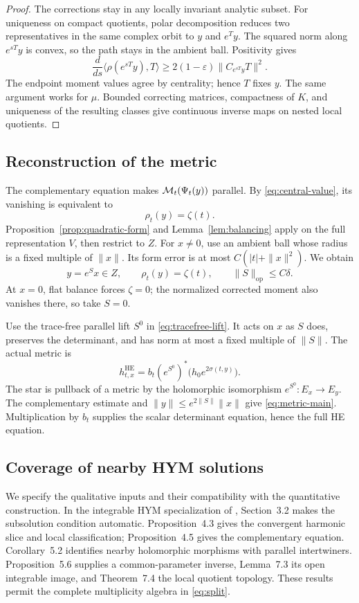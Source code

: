 \begin{proof}
The corrections stay in any locally invariant analytic subset.
For uniqueness on compact quotients, polar decomposition reduces two
representatives in the same complex orbit to $y$ and $e^Ty$. The
squared norm along $e^{sT}y$ is convex, so the path stays in the
ambient ball. Positivity gives
\[
 \frac{d}{ds}\langle\rho(e^{sT}y),T\rangle
        \ge2(1-\varepsilon)\|C_{e^{sT}y}T\|^2 .
\]
The endpoint moment values agree by centrality; hence $T$ fixes $y$.
The same argument works for $\mu$. Bounded correcting matrices,
compactness of $K$, and uniqueness of the resulting classes give
continuous inverse maps on nested local quotients.
\end{proof}

\subsection{Reconstruction of the metric}
The complementary equation makes $\mathcal M_t(\Psi_t(y))$ parallel.
By \eqref{eq:central-value}, its vanishing is equivalent to
\[
 \rho_t(y)=\zeta(t).
\]
Proposition~\ref{prop:quadratic-form} and Lemma~\ref{lem:balancing}
apply on the full representation $V$, then restrict to $Z$.
For $x\ne0$, use an ambient ball whose radius is a fixed multiple
of $\|x\|$. Its form error is at most $C(|t|+\|x\|^2)$.
We obtain
\begin{equation}\label{eq:S-bound}
 y=e^Sx\in Z,\qquad \rho_t(y)=\zeta(t),\qquad
             \|S\|_{\mathrm{op}}\le C\delta.
\end{equation}
At $x=0$, flat balance forces $\zeta=0$; the normalized corrected
moment also vanishes there, so take $S=0$.

Use the trace-free parallel lift $S^0$ in \eqref{eq:tracefree-lift}.
It acts on $x$ as $S$ does, preserves the determinant, and has norm
at most a fixed multiple of $\|S\|$. The actual metric is
\begin{equation}\label{eq:actual-metric}
 h^{\mathrm{HE}}_{t,x}
    =b_t(e^{S^0})^*\bigl(h_0e^{2\sigma(t,y)}\bigr).
\end{equation}
The star is pullback of a metric by the holomorphic isomorphism
$e^{S^0}:E_x\to E_y$.
The complementary estimate and $\|y\|\le e^{2\|S\|}\|x\|$
give \eqref{eq:metric-main}. Multiplication by $b_t$ supplies the
scalar determinant equation, hence the full HE equation.

\subsection{Coverage of nearby HYM solutions}\label{subsec:coverage}
We specify the qualitative inputs and their compatibility with the
quantitative construction. In the integrable HYM specialization of
\cite{delloque}, Section~3.2 makes the subsolution condition automatic.
Proposition~4.3 gives the convergent harmonic slice and local
classification; Proposition~4.5 gives the complementary equation.
Corollary~5.2 identifies nearby holomorphic morphisms with parallel
intertwiners. Proposition~5.6 supplies a common-parameter inverse,
Lemma~7.3 its open integrable image, and Theorem~7.4 the local
quotient topology. These results permit the complete multiplicity
algebra in \eqref{eq:split}.

